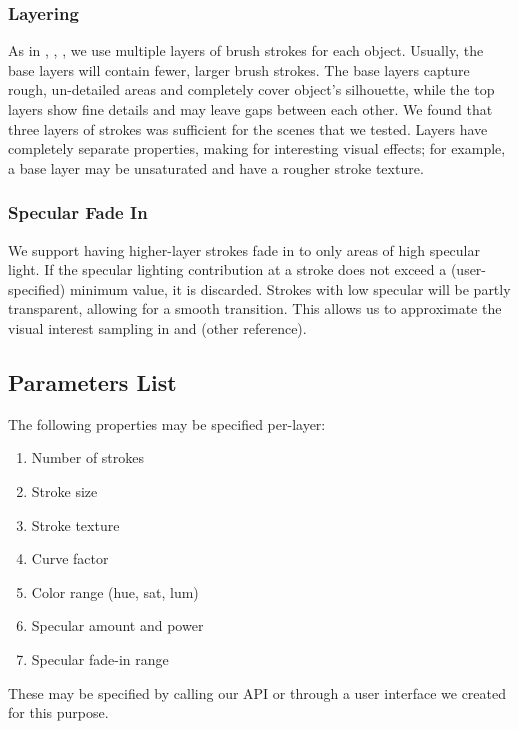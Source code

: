 \documentclass[conference]{acmsiggraph}
\begin{document}
\subsubsection{Layering}

As in \cite{Hertzmann:1998:PRC:280814.280951},
\cite{Meier:1996:PRA:237170.237288}, \cite{Lu:2010:IPS:1730804.1730825}, we use
multiple layers of brush strokes for each object. Usually, the base layers will
contain fewer, larger brush strokes. The base layers capture rough, un-detailed
areas and completely cover object's silhouette, while the top layers show fine
details and may leave gaps between each other. We found that three layers of
strokes was sufficient for the scenes that we tested. Layers have completely
separate properties, making for interesting visual effects; for example, a base
layer may be unsaturated and have a rougher stroke texture.

\subsubsection{Specular Fade In}

We support having higher-layer strokes fade in to only areas of high specular
light. If the specular lighting contribution at a stroke does not exceed a
(user-specified) minimum value, it is discarded. Strokes with low specular will
be partly transparent, allowing for a smooth transition. This allows us to
approximate the visual interest sampling in
\cite{Hertzmann:1998:PRC:280814.280951} and (other reference).


\subsection{Parameters List}

The following properties may be specified per-layer:

\begin{enumerate}
  \item Number of strokes
  \item Stroke size
  \item Stroke texture
  \item Curve factor
  \item Color range (hue, sat, lum)
  \item Specular amount and power
  \item Specular fade-in range
\end{enumerate}

These may be specified by calling our API or through a user interface we
created for this purpose.
\end{document}

